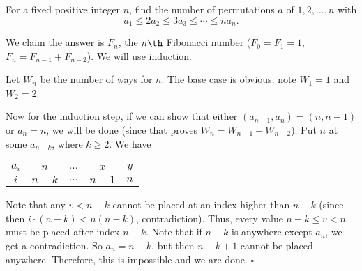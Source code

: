 
\begin{problem}[ISL 2020 C1]
    For a fixed positive integer $n$, find the number of permutations $a$ of
    $1, 2, \ldots, n$ with \[a_1 \leq 2a_2 \leq 3a_3 \leq \cdots \leq na_n.\]
\end{problem}

\begin{solution}[Ritwin]
    We claim the answer is $F_n$, the $n\th$ Fibonacci number ($F_0 = F_1 = 1$,
    $F_n = F_{n-1} + F_{n-2}$). We will use induction.
    
    Let $W_n$ be the number of ways for $n$. The base case is obvious: note
    $W_1 = 1$ and $W_2 = 2$.
    
    Now for the induction step, if we can show that either $(a_{n-1}, a_n) = (n, n-1)$
    or $a_n = n$, we will be done (since that proves $W_n = W_{n-1} + W_{n-2}$).
    Put $n$ at some $a_{n-k}$, where $k \geq 2$. We
    have \begin{center} \begin{tabular}{c|c c c c}
        $a_i$ & $n$   & $\ldots$ & $x$   & $y$\\
        $i$   & $n-k$ & $\ldots$ & $n-1$ & $n$
    \end{tabular} \end{center}
    Note that any $v < n-k$ cannot be placed at an index higher than $n-k$
    (since then $i \cdot (n-k) < n(n-k)$, contradiction). Thus, every value
    $n-k \leq v < n$ must be placed after index $n-k$. Note that if $n-k$ is
    anywhere except $a_n$, we get a contradiction. So $a_n = n-k$, but then
    $n-k+1$ cannot be placed anywhere. Therefore, this is impossible and we
    are done. $\square$
\end{solution}
